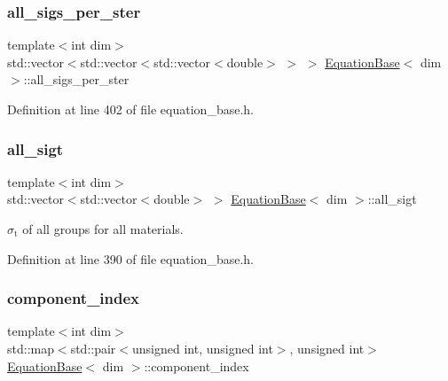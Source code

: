 \subsubsection{\texorpdfstring{all\+\_\+sigs\+\_\+per\+\_\+ster}{all\_sigs\_per\_ster}}
{\footnotesize\ttfamily template$<$int dim$>$ \\
std\+::vector$<$std\+::vector$<$std\+::vector$<$double$>$ $>$ $>$ \hyperlink{class_equation_base}{Equation\+Base}$<$ dim $>$\+::all\+\_\+sigs\+\_\+per\+\_\+ster\hspace{0.3cm}{\ttfamily [protected]}}



Definition at line 402 of file equation\+\_\+base.\+h.

\mbox{\label{class_equation_base_a818488c38892b44ccf25eb6f61e89ecc}} 
\subsubsection{\texorpdfstring{all\+\_\+sigt}{all\_sigt}}
{\footnotesize\ttfamily template$<$int dim$>$ \\
std\+::vector$<$std\+::vector$<$double$>$ $>$ \hyperlink{class_equation_base}{Equation\+Base}$<$ dim $>$\+::all\+\_\+sigt\hspace{0.3cm}{\ttfamily [protected]}}



$\sigma_\mathrm{t}$ of all groups for all materials. 



Definition at line 390 of file equation\+\_\+base.\+h.

\mbox{\label{class_equation_base_a7e2b3d305d1f1f7799acff6c86bc67f8}} 
\subsubsection{\texorpdfstring{component\+\_\+index}{component\_index}}
{\footnotesize\ttfamily template$<$int dim$>$ \\
std\+::map$<$std\+::pair$<$unsigned int, unsigned int$>$, unsigned int$>$ \hyperlink{class_equation_base}{Equation\+Base}$<$ dim $>$\+::component\+\_\+index\hspace{0.3cm}{\ttfamily [protected]}}



